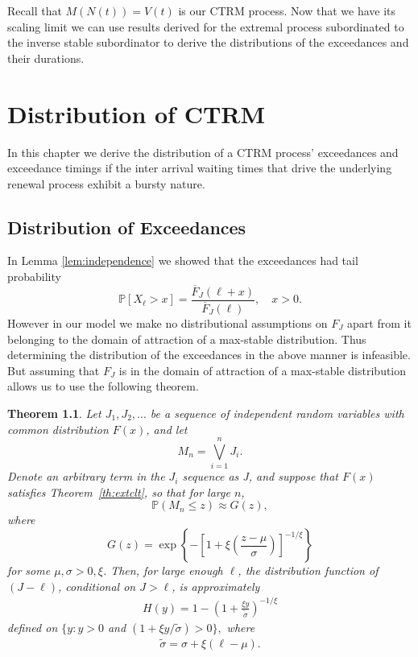 \documentclass[honours,12pt,twoside, openright]{unswthesis}
\newcommand{\PP}{\mathbb{P}}
\newcommand{\1}{\mathbf 1}
\newtheorem{theorem}[equation]{Theorem}
\numberwithin{equation}{section}
\theoremstyle{definition}
\theoremstyle{remark}
\begin{document}
\noindent Recall that $M(N(t))=V(t)$ is our CTRM process. Now that we have its scaling limit we can use results derived for the extremal process subordinated to the inverse stable subordinator to derive the distributions of the exceedances and their durations.
\chapter{Distribution of CTRM}\label{distributions}
In this chapter we derive the distribution of a CTRM process' exceedances and exceedance timings if the inter arrival waiting times that drive the underlying renewal process exhibit a bursty nature.
\section{Distribution of Exceedances}
In Lemma \ref{lem:independence} we showed that the exceedances had tail probability
\[
\PP[X_\ell > x]= \frac{\overline F_J(\ell + x)}{\overline F_J(\ell)}, \quad x > 0.
\] 
However in our model we make no distributional assumptions on $F_J$ apart from it belonging to the domain of attraction of a max-stable distribution. Thus determining the distribution of the exceedances in the above manner is infeasible. But assuming that $F_J$ is in the domain of attraction of a max-stable distribution allows us to use the following theorem.
\begin{theorem}\cite{ColesBook}\label{th:GP}
Let $J_1,J_2,...$ be a sequence of independent random variables with common distribution $F(x)$, and let
\[
	M_n=\bigvee_{i=1}^n J_i.
\]
Denote an arbitrary term in the $J_i$ sequence as J, and suppose that $F(x)$ satisfies Theorem~\ref{th:extclt}, so that for large $n$,
\[
	\PP(M_n\leq z)\approx G(z),
\]
where
\[
	G(z)=\exp\left\{-\left[1+\xi\left(\frac{z-\mu}{\sigma}\right)\right]^{-1/\xi}\right\}
\]
for some $\mu,\sigma>0,\xi$. Then, for large enough $\ell$, the distribution function of $(J-\ell)$, conditional on $J>\ell$, is approximately
\begin{align}\label{eq:GPfamily}
	H(y)=1-\left(1+\frac{\xi y}{\tilde \sigma}\right)^{-1/\xi}
\end{align}
defined on $\{y:y>0$ and $(1+\xi y/\tilde \sigma)>0 \},$ where
\begin{align*}
	\tilde \sigma =\sigma + \xi(\ell-\mu).
\end{align*}
\end{theorem}
\end{document}
